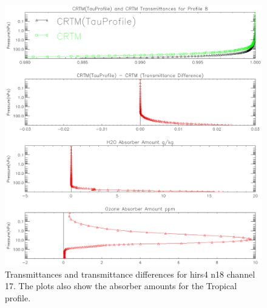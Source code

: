 \begin{figure}[htp]
  \centering{}
  \includegraphics[scale=0.8]{./graphics/Transmittance_Comparison_ch17_P08.eps}
  \caption{Transmittances and transmittance differences for hirs4 n18 channel 17. The plots also show the absorber amounts
  for the Tropical profile.}
  \label{fig:Transmittances_Tropical_ch17}
\end{figure}

